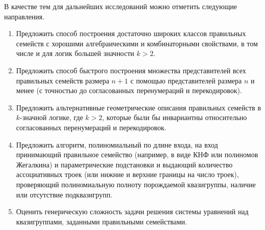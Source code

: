     В качестве тем для дальнейших исследований можно отметить следующие направления.

    \begin{enumerate}
        \item Предложить способ построения достаточно широких классов правильных семейств с хорошими алгебраическими и комбинаторными свойствами, в том числе и для логик большей значности $k > 2$.

        \item Предложить способ быстрого построения множества представителей всех правильных семейств размера $n+1$ с помощью представителей размера $n$ и менее (с точностью до согласованных перенумераций и перекодировок).

        \item Предложить альтернативные геометрические описания правильных семейств в $k$-значной логике, где $k>2$, которые были бы инвариантны относительно согласованных перенумераций и перекодировок.

        \item Предложить алгоритм, полиномиальный по длине входа, на вход принимающий правильное семейство (например, в виде КНФ или полиномов Жегалкина) и параметрические подстановки и выдающий количество ассоциативных троек (или нижние и верхние границы на число троек), проверяющий полиномиальную полноту порождаемой квазигруппы, наличие или отсутствие подквазигрупп.

        \item Оценить генерическую сложность задачи решения системы уравнений над квазигруппами, заданными правильными семействами.
    \end{enumerate}
